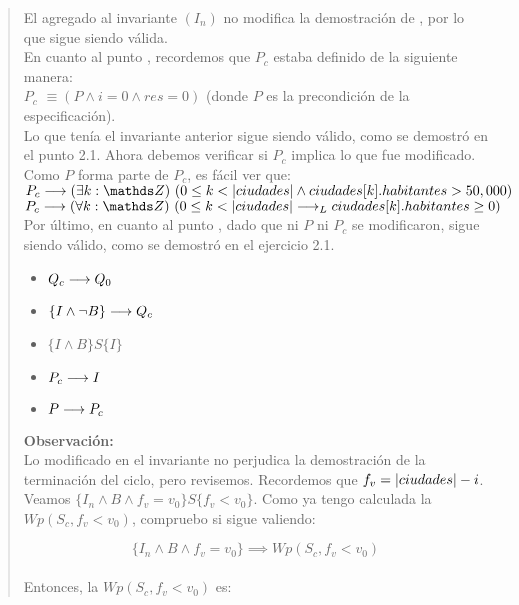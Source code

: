 \documentclass[10pt,a4paper]{article}
\begin{document}
\begin{quote}
El agregado al invariante $(I_n)$ no modifica la demostración de \textbf{}, por lo que sigue siendo válida. \\ [0.2cm]

En cuanto al punto \textbf{}, recordemos que $P_c$ estaba definido de la siguiente manera: \\ [0.2cm]
\textbf{$P_c$} $\equiv (P \land i = 0 \land res = 0)$ (donde $P$ es la precondición de la especificación). \\ [0.2cm]
Lo que tenía el invariante anterior sigue siendo válido, como se demostró en el punto 2.1. Ahora debemos verificar si $P_c$ implica lo que fue modificado. \\ [0.2cm]
Como $P$ forma parte de $P_c$, es fácil ver que: \\ [0.1cm]
$P_c \implica \existe[unalinea]{k}{\ent}{0 \leq k < \longitud{ciudades} \land ciudades[k].habitantes > 50,000}$ \\ 
$P_c \implica \paraTodo[unalinea]{k}{\ent}{0 \leq k < \longitud{ciudades} \implicaLuego ciudades[k].habitantes \geq 0}$ \\ [0.2cm]

Por último, en cuanto al punto \textbf{}, dado que ni $P$ ni $P_c$ se modificaron, sigue siendo válido, como se demostró en el ejercicio 2.1. \\ [0.2cm]
\begin{itemize}
	\item \textbf{ $Q_c \longrightarrow Q_0$} \checkmark
	\item \textbf{ $\{I \land \neg B\} \longrightarrow Q_c$} \checkmark
	\item \textbf{ $\{I \land B\} S \{I\}$} \checkmark
	\item \textbf{ $P_c \longrightarrow I$} \checkmark
	\item \textbf{ $P \longrightarrow P_c$} \checkmark
\end{itemize}
\textbf{Observación:} \\[0.2cm]
Lo modificado en el invariante no perjudica la demostración de la terminación del ciclo, pero revisemos. Recordemos que $f_v = |ciudades| - i$. \\[0.2cm]
Veamos $\{I_n \land B \land f_v = v_0\} S \{f_v < v_0\}$. Como ya tengo calculada la $Wp(S_c, f_v < v_0)$, compruebo si sigue valiendo:

\[
\{I_n \land B \land f_v = v_0\} \implies Wp(S_c, f_v < v_0)
\] \\[0.2cm]
Entonces, la $Wp(S_c, f_v < v_0)$ es:


\end{quote}
\end{document}
